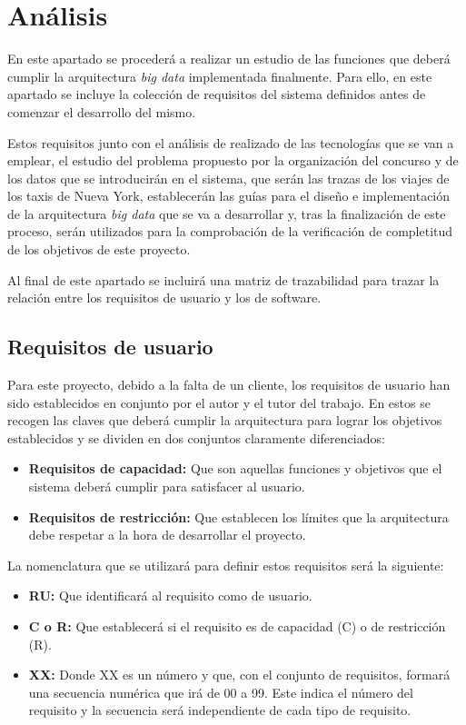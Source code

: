 \chapter{Análisis \label{sec:analisis}}
En este apartado se procederá a realizar un estudio de las funciones que deberá cumplir la arquitectura \textit{big data} implementada finalmente. Para ello, en este apartado se incluye la colección de requisitos del sistema definidos antes de comenzar el desarrollo del mismo.

Estos requisitos junto con el análisis de realizado de las tecnologías que se van a emplear, el estudio del problema propuesto por la organización del concurso y de los datos que se introducirán en el sistema, que serán las trazas de los viajes de los taxis de Nueva York, establecerán las guías para el diseño e implementación de la arquitectura \textit{big data} que se va a desarrollar y, tras la finalización de este proceso, serán utilizados para la comprobación de la verificación de completitud de los objetivos de este proyecto.

Al final de este apartado se incluirá una matriz de trazabilidad para trazar la relación entre los requisitos de usuario y los de software.

\section{Requisitos de usuario}
Para este proyecto, debido a la falta de un cliente, los requisitos de usuario han sido establecidos en conjunto por el autor y el tutor del trabajo. En estos se recogen las claves que deberá cumplir la arquitectura para lograr los objetivos establecidos y se dividen en dos conjuntos claramente diferenciados:

\begin{itemize}
\item \textbf{Requisitos de capacidad:} Que son aquellas funciones y objetivos que el sistema deberá cumplir para satisfacer al usuario.
\item \textbf{Requisitos de restricción:} Que establecen los límites que la arquitectura debe respetar a la hora de desarrollar el proyecto.
\end{itemize}

La nomenclatura que se utilizará para definir estos requisitos será la siguiente:

\begin{itemize}
\item \textbf{RU:} Que identificará al requisito como de usuario.
\item \textbf{C o R:} Que establecerá si el requisito es de capacidad (C) o de restricción (R).
\item \textbf{XX:} Donde XX es un número y que, con el conjunto de requisitos, formará una secuencia numérica que irá de 00 a 99. Este indica el número del requisito y la secuencia será independiente de cada tipo de requisito.
\end{itemize}


